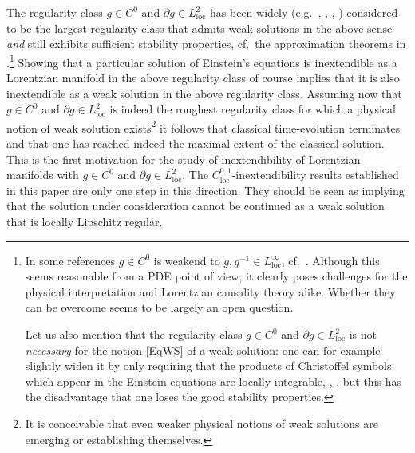 \documentclass[reqno]{article}
\newcommand{\loc}{\mathrm{loc}}
\newcommand{\rd}{\partial}
\begin{document}
The regularity class $g \in C^0$ and $\partial g \in L^2_{\loc}$ has been widely (e.g.\ \cite{HawkEllis}, \cite{GerTra87}, \cite{Chrus91}, \cite{Chris09}) considered to be the largest regularity class that admits weak solutions in the above sense \emph{and} still exhibits sufficient stability properties, cf.\ the approximation theorems in \cite{GerTra87}.\footnote{In some references $g \in C^0$ is weakend to $g, g^{-1} \in L^\infty_{\loc}$, cf.\ \cite{GerTra87}.  Although this seems reasonable from a PDE point of view, it clearly poses challenges for the physical interpretation and Lorentzian causality theory alike. Whether they can be overcome seems to be largely an open question. 

Let us also mention that the  regularity class $g \in C^0$ and $\partial g \in L^2_{\loc}$ is not \emph{necessary} for the notion \eqref{EqWS} of a weak solution: one can for example slightly widen it by only requiring that the products of Christoffel symbols which appear in the Einstein equations are locally integrable, \cite{Gar99}, \cite{GerTra87}, but this has the disadvantage that one loses the good stability properties.}  Showing that a particular solution of Einstein's equations is inextendible as a Lorentzian manifold in the above regularity class of course implies that it is also inextendible as a weak solution in the above regularity class. Assuming now that $g \in C^0$ and $\partial g \in L^2_{\loc}$ is indeed the roughest regularity class for which a physical notion of weak solution exists\footnote{It is conceivable that even weaker physical notions of weak solutions are emerging or establishing themselves.} it follows that classical time-evolution terminates and that one has reached indeed the maximal extent of the classical solution. This is the first motivation for the study of inextendibility of Lorentzian manifolds with $g \in C^0$ and $\rd g \in L^2_{\loc}$. 
The  $C^{0,1}_{\loc}$-inextendibility results established in this paper are only one step in this direction. They should be seen as implying that the solution under consideration cannot be continued as a weak solution that is locally Lipschitz regular.
\end{document}
